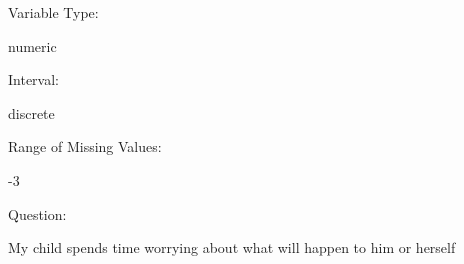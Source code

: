 \documentclass[
]{article}
\begin{document}
\begin{minipage}[t]{0.3\linewidth}

Variable Type:

\end{minipage}%
\begin{minipage}[t]{0.7\linewidth}

numeric

\end{minipage}

\begin{minipage}[t]{0.3\linewidth}

Interval:

\end{minipage}%
\begin{minipage}[t]{0.7\linewidth}

discrete

\end{minipage}

\begin{minipage}[t]{0.3\linewidth}

Range of Missing Values:

\end{minipage}%
\begin{minipage}[t]{0.7\linewidth}

-3

\end{minipage}

\begin{minipage}[t]{0.3\linewidth}

Question:

\end{minipage}%
\begin{minipage}[t]{0.7\linewidth}

My child spends time worrying about what will happen to him or herself

\end{minipage}
\end{document}
